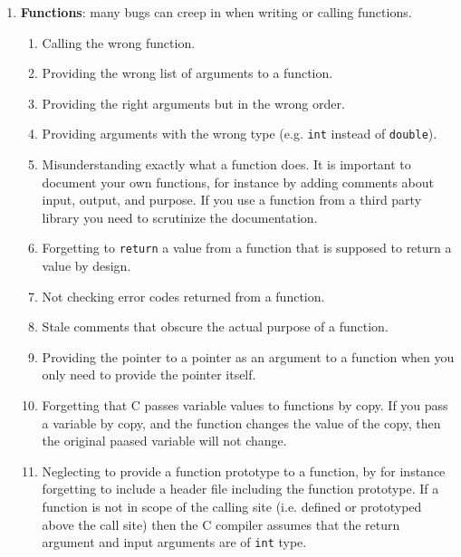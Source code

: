 \begin{enumerate}
    \item {\bf Functions}: many bugs can creep in when writing or calling functions.
    \begin{enumerate}
       \item Calling the wrong function.
       \item Providing the wrong list of arguments to a function.
       \item Providing the right arguments but in the wrong order. 
       \item Providing arguments with the wrong type (e.g. \texttt{int} instead of \texttt{double}).
       \item Misunderstanding exactly what a function does. It is important to document your own functions, for instance by adding comments about input, output, and purpose.  If you use a function from a third party library you need to scrutinize the documentation. 
       \item Forgetting to \texttt{return} a value from a function that is supposed to return a value by design. 
       \item Not checking error codes returned from a function.
       \item Stale comments that obscure the actual purpose of a function.
       \item Providing the pointer to a pointer as an argument to a function when you only need to provide the pointer itself.
       \item Forgetting that C passes variable values to functions by copy. If you pass a variable by copy, and the function changes the value of the copy, then the original paased variable will not change.
       \item Neglecting to provide a function prototype to a function, by for instance forgetting to include a header file including the function prototype. If a function is not in scope of the calling site (i.e. defined or prototyped above the call site) then the C compiler assumes that the return argument and input arguments are of \texttt{int} type.
   \end{enumerate}
   

\end{enumerate}
